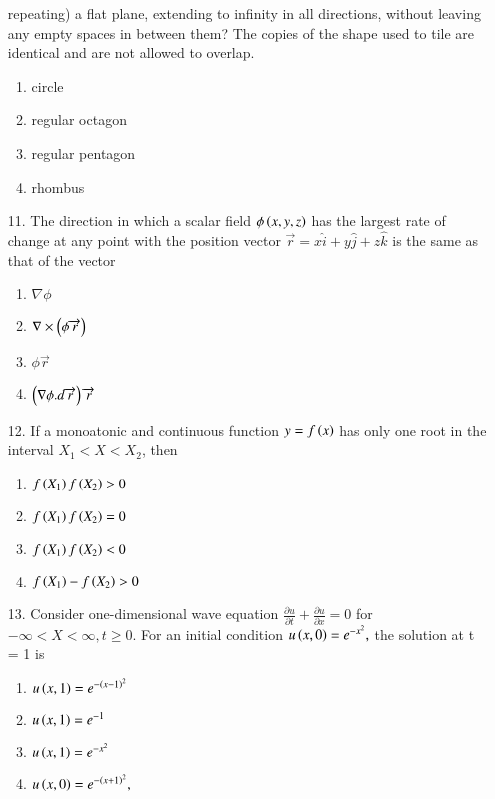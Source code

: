 \documentclass[journal]{IEEEtran}
\begin{document}
\begin{enumerate}
    repeating) a flat plane, extending to infinity in all directions, without leaving any
    empty spaces in between them? The copies of the shape used to tile are identical
    and are not allowed to overlap.
    \begin{enumerate}[label = (\Alph*)]
        \item circle 
        \item regular octagon
        \item regular pentagon
        \item rhombus
    \end{enumerate}
    \item[11.] The direction in which a scalar field $\phi\left(x, y, z\right)$ has the largest rate of change at any point with the position vector $\overrightarrow{r} = x\hat{i} + y\hat{j} +z\hat{k}$ is the same as that of the vector 
    \begin{enumerate}[label = (\Alph*)]
        \item $\nabla \phi$
        \item $\nabla\times\left(\phi\overrightarrow{r}\right)$
        \item $\phi\overrightarrow{r}$
        \item $\left(\nabla\phi.d\overrightarrow{r}\right)\overrightarrow{r}$
    \end{enumerate}
    \item[12.] If a monoatonic and continuous function $y = f\left(x\right)$ has only one root in the interval $X_1<X<X_2$, then 
    \begin{enumerate}[label = (\Alph*)]
        \item $f\left(X_1\right)f\left(X_2\right)>0$
        \item $f\left(X_1\right)f\left(X_2\right)=0$
        \item $f\left(X_1\right)f\left(X_2\right)<0$
        \item $f\left(X_1\right)-f\left(X_2\right)>0$
    \end{enumerate}
    \item[13.] Consider one-dimensional wave equation $\frac{\partial u}{\partial t}+\frac{\partial u}{\partial x} = 0$ for $-\infty<X<\infty, t\geq 0$. For an initial condition $u\left(x,0\right)=e^{-x^2},$ the solution at t = 1 is 
    \begin{enumerate}[label = (\Alph*)]
        \item $u\left(x,1\right)=e^{-\left(x-1\right)^2}$
        \item $u\left(x,1\right)=e^{-1}$
        \item $u\left(x,1\right)=e^{-x^2}$
        \item $u\left(x,0\right)=e^{-\left(x+1\right)^2},$
    \end{enumerate} 
\end{enumerate}
\end{document}
